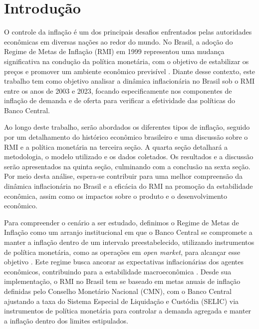 \documentclass[12pt,oneside,a4paper,chapter=TITLE,english,brazil,sumario=abnt-6027-2012]{abntex2}
\begin{document}
\tableofcontents*
\cleardoublepage


\textual %
\pagestyle{simple}

\chapter{Introdução}

O controle da inflação é um dos principais desafios enfrentados pelas autoridades econômicas em diversas nações ao redor do mundo. No Brasil, a adoção do Regime de Metas de Inflação (RMI) em 1999 representou uma mudança significativa na condução da política monetária, com o objetivo de estabilizar os preços e promover um ambiente econômico previsível \cite{fraga_2003_inflation}. Diante desse contexto, este trabalho tem como objetivo analisar a dinâmica inflacionária no Brasil sob o RMI entre os anos de 2003 e 2023, focando especificamente nos componentes de inflação de demanda e de oferta para verificar a efetividade das políticas do Banco Central.

Ao longo deste trabalho, serão abordados os diferentes tipos de inflação, seguido por um detalhamento do histórico econômico brasileiro e uma discussão sobre o RMI e a política monetária na terceira seção. A quarta seção detalhará a metodologia, o modelo utilizado e os dados coletados. Os resultados e a discussão serão apresentados na quinta seção, culminando com a conclusão na sexta seção. Por meio desta análise, espera-se contribuir para uma melhor compreensão da dinâmica inflacionária no Brasil e a eficácia do RMI na promoção da estabilidade econômica, assim como os impactos sobre o produto e o desenvolvimento econômico.

Para compreender o cenário a ser estudado, definimos o Regime de Metas de Inflação como um arranjo institucional em que o Banco Central se compromete a manter a inflação dentro de um intervalo preestabelecido, utilizando instrumentos de política monetária, como as operações em \textit{open market}, para alcançar esse objetivo \cite{svensson_1997_inflation}. Este regime busca ancorar as expectativas inflacionárias dos agentes econômicos, contribuindo para a estabilidade macroeconômica \cite{mishkin_2000_inflation}. Desde sua implementação, o RMI no Brasil tem se baseado em metas anuais de inflação definidas pelo Conselho Monetário Nacional (CMN), com o Banco Central ajustando a taxa do Sistema Especial de Liquidação e Custódia (SELIC) via instrumentos de política monetária para controlar a demanda agregada e manter a inflação dentro dos limites estipulados.
\end{document}
